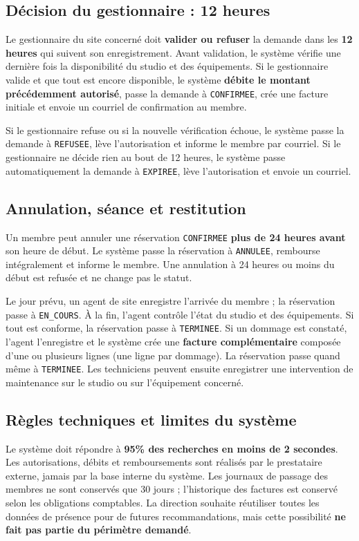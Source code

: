 \documentclass[10pt,a4paper]{article}
\begin{document}
\subsection{Décision du gestionnaire : 12 heures}
Le gestionnaire du site concerné doit \textbf{valider ou refuser} la demande dans les \textbf{12 heures} qui suivent son enregistrement. Avant validation, le système vérifie une dernière fois la disponibilité du studio et des équipements. Si le gestionnaire valide et que tout est encore disponible, le système \textbf{débite le montant précédemment autorisé}, passe la demande à \texttt{CONFIRMEE}, crée une facture initiale et envoie un courriel de confirmation au membre.

Si le gestionnaire refuse ou si la nouvelle vérification échoue, le système passe la demande à \texttt{REFUSEE}, lève l'autorisation et informe le membre par courriel. Si le gestionnaire ne décide rien au bout de 12 heures, le système passe automatiquement la demande à \texttt{EXPIREE}, lève l'autorisation et envoie un courriel.

\subsection{Annulation, séance et restitution}
Un membre peut annuler une réservation \texttt{CONFIRMEE} \textbf{plus de 24 heures avant} son heure de début. Le système passe la réservation à \texttt{ANNULEE}, rembourse intégralement et informe le membre. Une annulation à 24 heures ou moins du début est refusée et ne change pas le statut.

Le jour prévu, un agent de site enregistre l'arrivée du membre ; la réservation passe à \texttt{EN\_COURS}. À la fin, l'agent contrôle l'état du studio et des équipements. Si tout est conforme, la réservation passe à \texttt{TERMINEE}. Si un dommage est constaté, l'agent l'enregistre et le système crée une \textbf{facture complémentaire} composée d'une ou plusieurs lignes (une ligne par dommage). La réservation passe quand même à \texttt{TERMINEE}. Les techniciens peuvent ensuite enregistrer une intervention de maintenance sur le studio ou sur l'équipement concerné.

\subsection{Règles techniques et limites du système}
Le système doit répondre à \textbf{95\% des recherches en moins de 2 secondes}. Les autorisations, débits et remboursements sont réalisés par le prestataire externe, jamais par la base interne du système. Les journaux de passage des membres ne sont conservés que 30 jours ; l'historique des factures est conservé selon les obligations comptables. La direction souhaite réutiliser toutes les données de présence pour de futures recommandations, mais cette possibilité \textbf{ne fait pas partie du périmètre demandé}.
\end{document}

